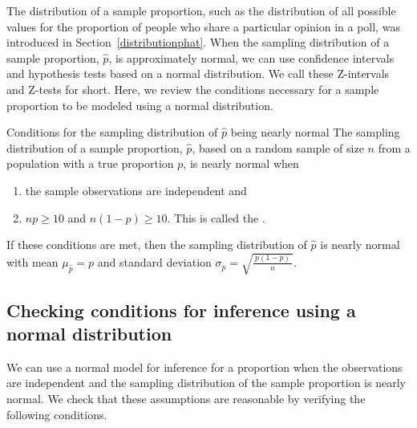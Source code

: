 The distribution of a sample proportion, such as the distribution of all possible values for the proportion of people who share a particular opinion in a poll, was introduced in Section~\ref{distributionphat}.  When the sampling distribution of a sample proportion, $\hat{p}$, is approximately normal, we can use confidence intervals and hypothesis tests based on a normal distribution.  We call these Z-intervals and Z-tests for short.  Here, we review the conditions necessary for a sample proportion to be modeled using a normal distribution.

\begin{onebox}{Conditions for the sampling distribution of $\hat{p}$ being nearly normal}
The sampling distribution of a sample proportion, $\hat{p}$, based on a random sample of size $n$ from a population with a true proportion $p$, is nearly normal when
\begin{enumerate}
\item the sample observations are independent and
\item $np\geq10$ and $n(1-p)\geq10$. This is called the .
\end{enumerate}
If these conditions are met, then the sampling distribution of $\hat{p}$ is nearly normal with mean $\mu_{\hat{p}}=p$ and standard deviation $\sigma_{\hat{p}} = \sqrt{\frac{\ p(1-p)\ }{n}}$.\end{onebox}

\subsection{Checking conditions for inference using a normal distribution}
We can use a normal model for inference for a proportion when the observations are independent and the sampling distribution of the sample proportion is nearly normal.  We check that these assumptions are reasonable by verifying the following conditions.

